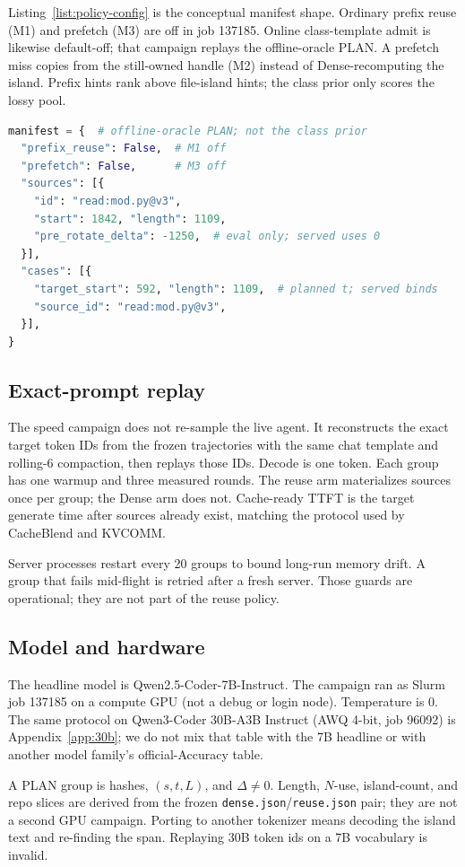 Listing~\ref{list:policy-config} is the conceptual manifest shape.
Ordinary prefix reuse (M1) and prefetch (M3) are off in job 137185.
Online class-template admit is likewise default-off; that campaign
replays the offline-oracle PLAN. A prefetch miss copies from the
still-owned handle (M2) instead of Dense-recomputing the island.
Prefix hints rank above file-island hints; the class prior only
scores the lossy pool.

\begin{lstlisting}[language=Python, caption={Eval PLAN manifest (job 137185). Served leases omit planned $t$ and store $K$ unrotated.}, label={list:policy-config}, breaklines=true, columns=fullflexible, basicstyle=\ttfamily\scriptsize]
manifest = {  # offline-oracle PLAN; not the class prior
  "prefix_reuse": False,  # M1 off
  "prefetch": False,      # M3 off
  "sources": [{
    "id": "read:mod.py@v3",
    "start": 1842, "length": 1109,
    "pre_rotate_delta": -1250,  # eval only; served uses 0
  }],
  "cases": [{
    "target_start": 592, "length": 1109,  # planned t; served binds
    "source_id": "read:mod.py@v3",
  }],
}
\end{lstlisting}

\subsection{Exact-prompt replay}

The speed campaign does not re-sample the live agent. It reconstructs
the exact target token IDs from the frozen trajectories with the same
chat template and rolling-6 compaction, then replays those IDs. Decode
is one token. Each group has one warmup and three measured rounds. The
reuse arm materializes sources once per group; the Dense arm does not.
Cache-ready TTFT is the target generate time after sources already
exist, matching the protocol used by CacheBlend and KVCOMM.

Server processes restart every 20 groups to bound long-run memory drift.
A group that fails mid-flight is retried after a fresh server. Those
guards are operational; they are not part of the reuse policy.

\subsection{Model and hardware}

The headline model is Qwen2.5-Coder-7B-Instruct. The campaign ran as
Slurm job 137185 on a compute GPU (not a debug or login node).
Temperature is 0. The same protocol on Qwen3-Coder 30B-A3B Instruct
(AWQ 4-bit, job 96092) is Appendix~\ref{app:30b}; we do not mix that
table with the 7B headline or with another model family's
official-Accuracy table.

A PLAN group is hashes, $(s,t,L)$, and $\Delta\neq 0$. Length, $N$-use,
island-count, and repo slices are derived from the frozen
\texttt{dense.json}/\texttt{reuse.json} pair; they are not a second GPU
campaign. Porting to another tokenizer means decoding the island text and
re-finding the span. Replaying 30B token ids on a 7B vocabulary is invalid.
